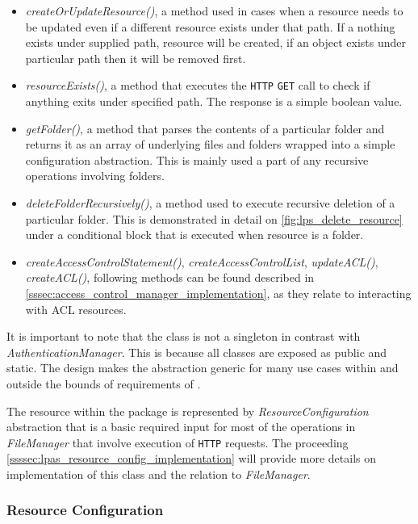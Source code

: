 \begin{itemize}
    \item \textit{createOrUpdateResource()}, a method used in cases when a resource needs to be updated even if a different resource exists under that path. If a nothing exists under supplied path, resource will be created, if an object exists under particular path then it will be removed first.
    \item \textit{resourceExists()}, a method that executes the \texttt{HTTP} \texttt{GET} call to check if anything exits under specified path. The response is a simple boolean value.
    \item \textit{getFolder()}, a method that parses the contents of a particular folder and returns it as an array of underlying files and folders wrapped into a simple configuration abstraction. This is mainly used a part of any recursive operations involving folders.
    \item \textit{deleteFolderRecursively()}, a method used to execute recursive deletion of a particular folder. This is demonstrated in detail on \autoref{fig:lps_delete_resource} under a conditional block that is executed when resource is a folder.  
    \item \textit{createAccessControlStatement()}, \textit{createAccessControlList}, \textit{updateACL()}, \textit{createACL()}, following methods can be found described in \autoref{sssec:access_control_manager_implementation}, as they relate to interacting with ACL resources.
\end{itemize}

It is important to note that the class is not a singleton in contrast with \textit{AuthenticationManager}. This is because all classes are exposed as public and static. The design makes the abstraction generic for many use cases within and outside the bounds of requirements of \lpa{}.

The \solid{} resource within the \lpas{} package is represented by \textit{ResourceConfiguration} abstraction that is a basic required input for most of the operations in \textit{FileManager} that involve execution of \texttt{HTTP} requests. The proceeding \autoref{ssssec:lpas_resource_config_implementation} will provide more details on implementation of this class and the relation to \textit{FileManager}.
 
\subsubsection{Resource Configuration}
\label{ssssec:lpas_resource_config_implementation}


